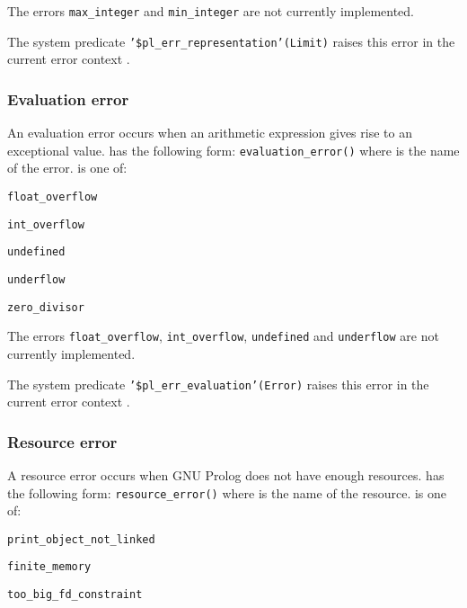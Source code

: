 The errors \texttt{max\_integer} and \texttt{min\_integer} are not currently
implemented.

The system predicate \texttt{'\$pl\_err\_representation'(Limit)} raises this
error in the current error context .

\subsubsection{Evaluation error}
\label{Evaluation-error}
An evaluation error occurs when an arithmetic expression gives rise to
an exceptional value.  has the following form:
\texttt{evaluation\_error()} where  is
the name of the error.  is one of:

\begin{ItemizeThreeCols}

\item \texttt{float\_overflow}

\item \texttt{int\_overflow}

\item \texttt{undefined}

\item \texttt{underflow}

\item \texttt{zero\_divisor}

\end{ItemizeThreeCols}

The errors \texttt{float\_overflow}, \texttt{int\_overflow},
\texttt{undefined} and \texttt{underflow} are not currently
implemented.

The system predicate \texttt{'\$pl\_err\_evaluation'(Error)} raises this
error in the current error context .

\subsubsection{Resource error}
\label{Resource-error}
A resource error occurs when GNU Prolog does not have enough resources.
 has the following form:
\texttt{resource\_error()} where  is the
name of the resource.  is one of:

\begin{ItemizeThreeCols}

\item \texttt{print\_object\_not\_linked}

\item \texttt{finite\_memory}

\item \texttt{too\_big\_fd\_constraint}

\end{ItemizeThreeCols}


